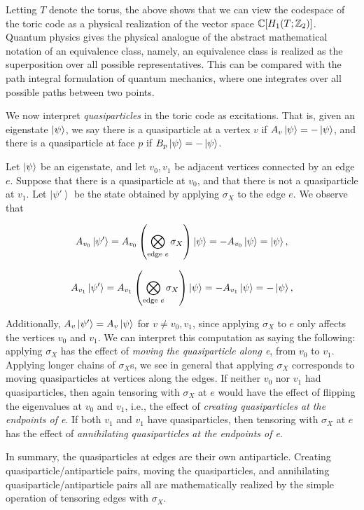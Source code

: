 \documentclass{article}
\theoremstyle{definition}
\numberwithin{figure}{section}
\begin{document}
Letting $T$ denote the torus, the above shows that we can view the codespace of the toric code as a physical realization of the vector space $\mathbb{C}[H_1(T;\mathbb{Z}_2)]$. Quantum physics gives the physical analogue of the abstract mathematical notation of an equivalence class, namely, an equivalence class is realized as the superposition over all possible representatives. This can be compared with the path integral formulation of quantum mechanics, where one integrates over all possible paths between two points.

We now interpret \textit{quasiparticles} in the toric code as excitations. That is, given an eigenstate $\left|\psi\right>$, we say there is a quasiparticle at a vertex $v$ if $A_v\left|\psi\right>=-\left|\psi\right>$, and there is a quasiparticle at face $p$ if $B_p\left|\psi\right>=-\left|\psi\right>$.

Let $\left|\psi\right>$ be an eigenstate, and let $v_0,v_1$ be adjacent vertices connected by an edge $e$. Suppose that there is a quasiparticle at $v_0$, and that there is not a quasiparticle at $v_1$. Let $\left| \psi'\right>$ be the state obtained by applying $\sigma_X$ to the edge $e$. We observe that

$$A_{v_0}\left| \psi'\right> = A_{v_0}\left(\bigotimes_{\text{edge }e}\sigma_X\right)\left|\psi\right>=-A_{v_0}\left|\psi\right>=\left|\psi\right>,$$

$$A_{v_1}\left| \psi'\right> = A_{v_1}\left(\bigotimes_{\text{edge }e}\sigma_X\right)\left|\psi\right>=-A_{v_1}\left|\psi\right>=-\left|\psi\right>,$$

Additionally, $A_{v}\left|\psi'\right>=A_{v}\left|\psi\right>$ for $v\neq v_0,v_1$, since applying $\sigma_X$ to $e$ only affects the vertices $v_0$ and $v_1$. We can interpret this computation as saying the following: applying $\sigma_X$ has the effect of \textit{moving the quasiparticle along e}, from $v_0$ to $v_1$. Applying longer chains of $\sigma_X$s, we see in general that applying $\sigma_X$ corresponds to moving quasiparticles at vertices along the edges. If neither $v_0$ nor $v_1$ had quasiparticles, then again tensoring with $\sigma_X$ at $e$ would have the effect of flipping the eigenvalues at $v_0$ and $v_1$, i.e., the effect of \textit{creating quasiparticles at the endpoints of e}. If both $v_1$ and $v_1$ have quasiparticles, then tensoring with $\sigma_X$ at $e$ has the effect of \textit{annihilating quasiparticles at the endpoints of e}.

In summary, the quasiparticles at edges are their own antiparticle. Creating quasiparticle/antiparticle pairs, moving the quasiparticles, and annihilating quasiparticle/antiparticle pairs all are mathematically realized by the simple operation of tensoring edges with $\sigma_X$.
\end{document}
